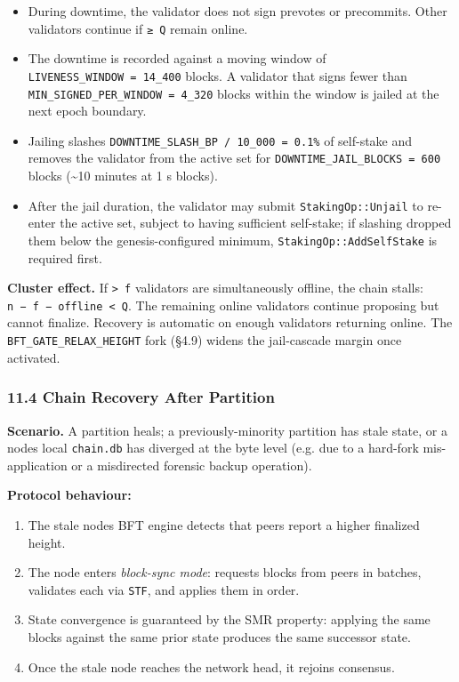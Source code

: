 \documentclass[11pt,a4paper]{article}
\providecommand{\tightlist}{\setlength{\itemsep}{0pt}\setlength{\parskip}{0pt}}
\begin{document}
\begin{itemize}
\tightlist
\item
  During downtime, the validator does not sign prevotes or precommits.
  Other validators continue if \texttt{≥\ Q} remain online.
\item
  The downtime is recorded against a moving window of
  \texttt{LIVENESS\_WINDOW\ =\ 14\_400} blocks. A validator that signs
  fewer than \texttt{MIN\_SIGNED\_PER\_WINDOW\ =\ 4\_320} blocks within
  the window is jailed at the next epoch boundary.
\item
  Jailing slashes \texttt{DOWNTIME\_SLASH\_BP\ /\ 10\_000\ =\ 0.1\%} of
  self-stake and removes the validator from the active set for
  \texttt{DOWNTIME\_JAIL\_BLOCKS\ =\ 600} blocks (\textasciitilde10
  minutes at 1 s blocks).
\item
  After the jail duration, the validator may submit
  \texttt{StakingOp::Unjail} to re-enter the active set, subject to
  having sufficient self-stake; if slashing dropped them below the
  genesis-configured minimum, \texttt{StakingOp::AddSelfStake} is
  required first.
\end{itemize}

\textbf{Cluster effect.} If \texttt{\textgreater{}\ f} validators are
simultaneously offline, the chain stalls:
\texttt{n\ −\ f\ −\ offline\ \textless{}\ Q}. The remaining online
validators continue proposing but cannot finalize. Recovery is automatic
on enough validators returning online. The
\texttt{BFT\_GATE\_RELAX\_HEIGHT} fork (§4.9) widens the jail-cascade
margin once activated.

\hypertarget{114-chain-recovery-after-partition}{%
\subsubsection{11.4 Chain Recovery After
Partition}\label{114-chain-recovery-after-partition}}

\textbf{Scenario.} A partition heals; a previously-minority partition
has stale state, or a node\textquotesingle s local \texttt{chain.db} has
diverged at the byte level (e.g. due to a hard-fork mis-application or a
misdirected forensic backup operation).

\textbf{Protocol behaviour:}

\begin{enumerate}
\def\labelenumi{\arabic{enumi}.}
\tightlist
\item
  The stale node\textquotesingle s BFT engine detects that peers report
  a higher finalized height.
\item
  The node enters \emph{block-sync mode}: requests blocks from peers in
  batches, validates each via \texttt{STF}, and applies them in order.
\item
  State convergence is guaranteed by the SMR property: applying the same
  blocks against the same prior state produces the same successor state.
\item
  Once the stale node reaches the network head, it rejoins consensus.
\end{enumerate}
\end{document}
